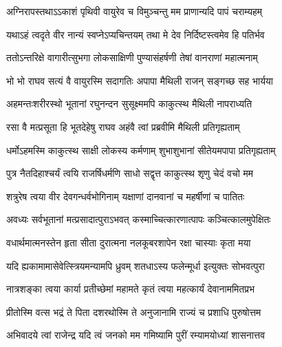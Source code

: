 \twolineshloka
{अग्निरापस्तथाऽऽकाशं पृथिवी वायुरेव च}
{विमुञ्चन्तु मम प्राणान्यदि पापं चराम्यहम्}


\twolineshloka
{यथाऽहं त्वदृते वीर नान्यं स्वप्नेऽप्यचिन्तयम्}
{तथा मे देव निर्दिष्टस्त्वमेव हि पतिर्भव}


\twolineshloka
{ततोऽन्तरिक्षे वागारीत्सुभगा लोकसाक्षिणी}
{पुण्यासंहर्षणी तेषां वानराणां महात्मनाम्}


\twolineshloka
{भो भो राघव सत्यं वै वायुरस्मि सदागतिः}
{अपापा मैथिली राजन् सङ्गच्छ सह भार्यया}


\twolineshloka
{अहमन्तःशरीरस्थो भूतानां रघुनन्दन}
{सुसूक्ष्ममपि काकुत्स्थ मैथिली नापराध्यति}


\twolineshloka
{रसा वै मत्प्रसूता हि भूतदेहेषु राघव}
{अहंवै त्वां प्रब्रवीमि मैथिली प्रतिगृह्यताम्}


\twolineshloka
{धर्मोऽहमस्मि काकुत्स्थ साक्षी लोकस्य कर्मणाम्}
{शुभाशुभानां सीतेयमपापा प्रतिगृह्यताम्}


\twolineshloka
{पुत्र नैतदिहाश्चर्यं त्वयि राजर्षिधर्मणि}
{साधो सद्वृत्त काकुत्स्थ शृणु चेदं वचो मम}

\twolineshloka
{शत्रुरेष त्वया वीर देवगन्धर्वभोगिनाम्}
{यक्षाणां दानवानां च महर्षीणां च पातितः}

\twolineshloka
{अवध्यः सर्वभूतानां मत्प्रसादात्पुराऽभवत्}
{कस्माच्चित्कारणात्पापः कञ्चित्कालमुपेक्षितः}


\twolineshloka
{वधार्थमात्मनस्तेन हृता सीता दुरात्मना}
{नलकूबरशापेन रक्षा चास्याः कृता मया}


\twolineshloka
{यदि ह्यकामामासेवेत्स्त्रियमन्यामपि ध्रुवम्}
{शतधाऽस्य फलेन्मूर्धा इत्युक्तः सोभवत्पुरा}


\twolineshloka
{नात्रशङ्का त्वया कार्या प्रतीच्छेमां महामते}
{कृतं त्वया महत्कार्यं देवानाममितप्रभ}



\twolineshloka
{प्रीतोस्मि वत्स भद्रं ते पिता दशरथोस्मि ते}
{अनुजानामि राज्यं च प्रशाधि पुरुषोत्तम}



\twolineshloka
{अभिवादये त्वां राजेन्द्र यदि त्वं जनको मम}
{गमिष्यामि पुरीं रम्यामयोध्यां शासनात्तव}



